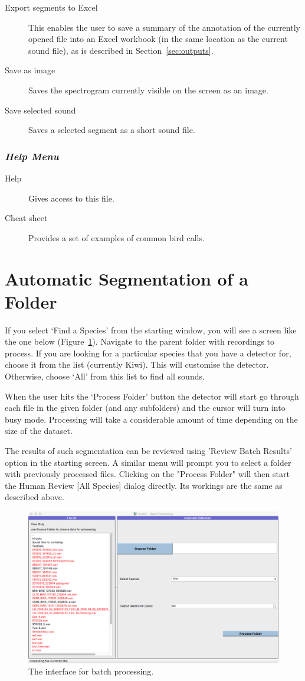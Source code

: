 \documentclass{article}
\begin{document}
\begin{description}
\item [Export segments to Excel] This enables the user to save a summary of the annotation of the currently opened file into an Excel workbook (in the same location as the current sound file), as is described in Section~\ref{sec:outputs}. 
\item [Save as image] Saves the spectrogram currently visible on the screen as an image.
\item [Save selected sound] Saves a selected segment as a short sound file.
\end{description}

\subsubsection{{\em Help Menu}}

\begin{description}
\item [Help] Gives access to this file.
\item [Cheat sheet] Provides a set of examples of common bird calls. 
\end{description}


\section{Automatic Segmentation of a Folder}
\label{sec:auto}
If you select `Find a Species' from the starting window, you will see a screen like the one below (Figure~\ref{batch}). Navigate to the parent folder with recordings to process. If you are looking for a particular species that you have a detector for, choose it from the list (currently Kiwi). This will customise the detector. Otherwise, choose `All' from this list to find all sounds. 

When the user hits the `Process Folder' button the detector will start go through each file in the given folder (and any subfolders) and the cursor will turn into busy mode. Processing will take a considerable amount of time depending on the size of the dataset.

The results of such segmentation can be reviewed using 'Review Batch Results' option in the starting screen. A similar menu will prompt you to select a folder with previously processed files. Clicking on the "Process Folder" will then start the Human Review [All Species] dialog directly. Its workings are the same as described above.

\begin{figure}[h!]
\centering
\includegraphics[width=.5\textwidth]{Figs/batchchoose}
\caption{The interface for batch processing.}
\label{batch}
\end{figure}
\end{document}
